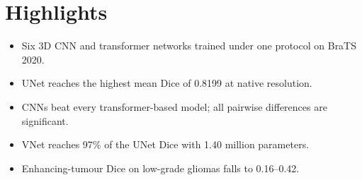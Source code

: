 \documentclass[12pt]{article}
\begin{document}
\section*{Highlights}

\begin{itemize}
\item Six 3D CNN and transformer networks trained under one protocol on BraTS 2020.
\item UNet reaches the highest mean Dice of 0.8199 at native resolution.
\item CNNs beat every transformer-based model; all pairwise differences are significant.
\item VNet reaches 97\% of the UNet Dice with 1.40 million parameters.
\item Enhancing-tumour Dice on low-grade gliomas falls to 0.16--0.42.
\end{itemize}
\end{document}
